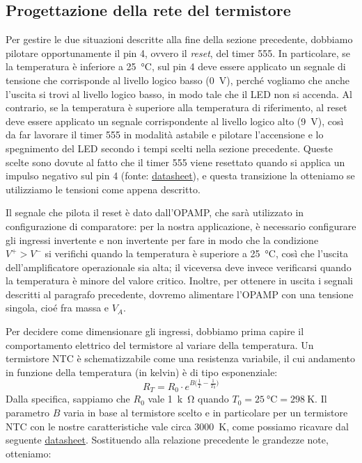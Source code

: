 \documentclass{report}
\begin{document}
\subsection{Progettazione della rete del termistore}\label{rete_termistore}
Per gestire le due situazioni descritte alla fine della sezione precedente, dobbiamo pilotare opportunamente il pin 4, ovvero il \textit{reset}, del timer 555. In particolare, se la temperatura è inferiore a \SI{25}{\celsius}, sul pin 4 deve essere applicato un segnale di tensione che corrisponde al livello logico basso (\SI{0}{\volt}), perché vogliamo che anche l'uscita si trovi al livello logico basso,  in modo tale che il LED non si accenda. Al contrario, se la temperatura è superiore alla temperatura di riferimento, al reset deve essere applicato un segnale corrispondente al livello logico alto (\SI{9}{\volt}), così da far lavorare il timer 555 in modalità astabile e pilotare l'accensione e lo spegnimento del LED secondo i tempi scelti nella sezione precedente. Queste scelte sono dovute al fatto che il timer 555 viene resettato quando si applica un impulso negativo sul pin 4 (fonte: \textcolor{blue}{\underline{\href{https://www.ti.com/lit/ds/symlink/lm555.pdf?ts=1667144089940&ref_url=https\%253A\%252F\%252Fwww.ti.com\%252Fproduct\%252FLM555}{datasheet}}}), e questa transizione la otteniamo se utilizziamo le tensioni come appena descritto. \par
Il segnale che pilota il reset è dato dall'OPAMP, che sarà utilizzato in configurazione di comparatore: per la nostra applicazione, è necessario configurare gli ingressi invertente e non invertente per fare in modo che la condizione $V^+>V^-$ si verifichi quando la temperatura è superiore a \SI{25}{\celsius}, così che l'uscita dell'amplificatore operazionale sia alta; il viceversa deve invece verificarsi quando la temperatura è minore del valore critico. Inoltre, per ottenere in uscita i segnali descritti al paragrafo precedente, dovremo alimentare l'OPAMP con una tensione singola, cioé fra massa e $V_A$. \par
Per decidere come dimensionare gli ingressi, dobbiamo prima capire il comportamento elettrico del termistore al variare della temperatura. Un termistore NTC è schematizzabile come una resistenza variabile, il cui andamento in funzione della temperatura (in kelvin) è di tipo esponenziale:
$$ R_T = R_0\cdot e^{B\bigl(\frac{1}{T}-\frac{1}{T_0}\bigr)}$$
Dalla specifica, sappiamo che $R_0$ vale \SI{1}{k\ohm} quando $T_0 = \SI{25}{\celsius}=\SI{298}{\kelvin}$. Il parametro $B$ varia in base al termistore scelto e in particolare per un termistore NTC con le nostre caratteristiche vale circa \SI{3000}{\kelvin}, come possiamo ricavare dal seguente \textcolor{blue}{\underline{\href{https://www.mouser.it/datasheet/2/240/Littelfuse_Leaded_Thermistors_Glass_Encapsulated_T-1315924.pdf}{datasheet}}}. Sostituendo alla relazione precedente le grandezze note, otteniamo:
\end{document}
